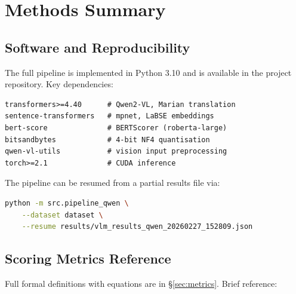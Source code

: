 \documentclass[12pt,a4paper]{article}
\begin{document}
\section{Methods Summary}

\subsection{Software and Reproducibility}

The full pipeline is implemented in Python 3.10 and is available in the project
repository.  Key dependencies:

\begin{lstlisting}
transformers>=4.40      # Qwen2-VL, Marian translation
sentence-transformers   # mpnet, LaBSE embeddings
bert-score              # BERTScorer (roberta-large)
bitsandbytes            # 4-bit NF4 quantisation
qwen-vl-utils           # vision input preprocessing
torch>=2.1              # CUDA inference
\end{lstlisting}

The pipeline can be resumed from a partial results file via:

\begin{lstlisting}[language=bash]
python -m src.pipeline_qwen \
    --dataset dataset \
    --resume results/vlm_results_qwen_20260227_152809.json
\end{lstlisting}

\subsection{Scoring Metrics Reference}

Full formal definitions with equations are in \S\ref{sec:metrics}.  Brief reference:
\end{document}
